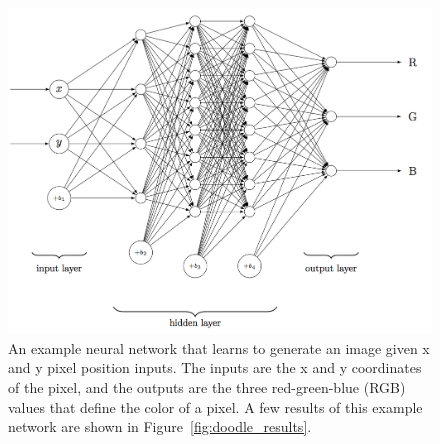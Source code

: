\documentclass[12pt,oneside,onecolumn,a4paper]{article}
\begin{document}
\begin{figure}[H]
\begin{center}
\includegraphics[width=0.8\columnwidth]{figures/doodle}
\caption{An example neural network that learns to generate an image given x and y pixel position inputs. The inputs are the x and y coordinates of the pixel, and the outputs are the three red-green-blue (RGB) values that define the color of a pixel. A few results of this example network are shown in Figure~\ref{fig:doodle_results}.
\label{fig:doodle}
}
\end{center}
\end{figure}
\end{document}
